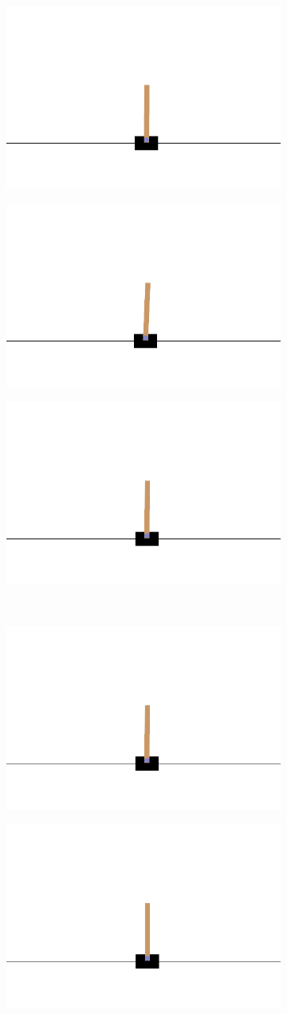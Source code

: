 \begin{figure}[H]
	\centering
	\begin{subfigure}
		\centering
		\includegraphics[width=0.3\linewidth]{Images/frames/RL/1.png}
	\end{subfigure}
	\hfill
	\begin{subfigure}
		\centering
		\includegraphics[width=0.3\linewidth]{Images/frames/RL/2.png}
	\end{subfigure}
	\hfill
	\begin{subfigure}
		\centering
		\includegraphics[width=0.3\linewidth]{Images/frames/RL/3.png}
	\end{subfigure}
	\\
	\begin{subfigure}
		\centering
		\includegraphics[width=0.3\linewidth]{Images/frames/RL/4.png}
	\end{subfigure}
	\hfill
	\begin{subfigure}
		\centering
		\includegraphics[width=0.3\linewidth]{Images/frames/RL/5.png}
	\end{subfigure}

\end{figure}
